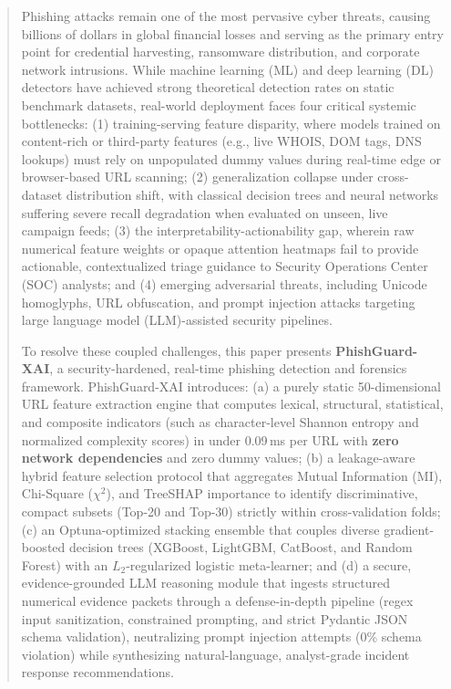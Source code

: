 \documentclass[journal]{IEEEtran}
\begin{document}
\begin{abstract}
Phishing attacks remain one of the most pervasive cyber threats, causing billions of dollars in global financial losses and serving as the primary entry point for credential harvesting, ransomware distribution, and corporate network intrusions. While machine learning (ML) and deep learning (DL) detectors have achieved strong theoretical detection rates on static benchmark datasets, real-world deployment faces four critical systemic bottlenecks: (1) training-serving feature disparity, where models trained on content-rich or third-party features (e.g., live WHOIS, DOM tags, DNS lookups) must rely on unpopulated dummy values during real-time edge or browser-based URL scanning; (2) generalization collapse under cross-dataset distribution shift, with classical decision trees and neural networks suffering severe recall degradation when evaluated on unseen, live campaign feeds; (3) the interpretability-actionability gap, wherein raw numerical feature weights or opaque attention heatmaps fail to provide actionable, contextualized triage guidance to Security Operations Center (SOC) analysts; and (4) emerging adversarial threats, including Unicode homoglyphs, URL obfuscation, and prompt injection attacks targeting large language model (LLM)-assisted security pipelines.

To resolve these coupled challenges, this paper presents \textbf{PhishGuard-XAI}, a security-hardened, real-time phishing detection and forensics framework. PhishGuard-XAI introduces: (a) a purely static 50-dimensional URL feature extraction engine that computes lexical, structural, statistical, and composite indicators (such as character-level Shannon entropy and normalized complexity scores) in under 0.09\,ms per URL with \textbf{zero network dependencies} and zero dummy values; (b) a leakage-aware hybrid feature selection protocol that aggregates Mutual Information (MI), Chi-Square ($\chi^2$), and TreeSHAP importance to identify discriminative, compact subsets (Top-20 and Top-30) strictly within cross-validation folds; (c) an Optuna-optimized stacking ensemble that couples diverse gradient-boosted decision trees (XGBoost, LightGBM, CatBoost, and Random Forest) with an $L_2$-regularized logistic meta-learner; and (d) a secure, evidence-grounded LLM reasoning module that ingests structured numerical evidence packets through a defense-in-depth pipeline (regex input sanitization, constrained prompting, and strict Pydantic JSON schema validation), neutralizing prompt injection attempts (0\% schema violation) while synthesizing natural-language, analyst-grade incident response recommendations.


\end{abstract}
\end{document}
